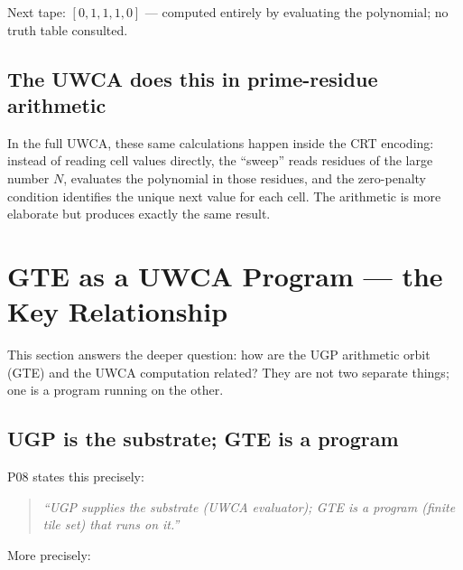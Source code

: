 \documentclass[11pt,a4paper]{article}
\begin{document}
\noindent Next tape: $[0, 1, 1, 1, 0]$ — computed entirely by evaluating the
polynomial; no truth table consulted.

\subsection{The UWCA does this in prime-residue arithmetic}

In the full UWCA, these same calculations happen inside the CRT encoding:
instead of reading cell values directly, the ``sweep'' reads residues of the
large number $N$, evaluates the polynomial in those residues, and the
zero-penalty condition identifies the unique next value for each cell.  The
arithmetic is more elaborate but produces exactly the same result.

\section{GTE as a UWCA Program — the Key Relationship}

This section answers the deeper question: how are the UGP arithmetic orbit
(GTE) and the UWCA computation related?  They are not two separate things;
one is a program running on the other.

\subsection{UGP is the substrate; GTE is a program}

P08 states this precisely:

\begin{quote}
\emph{``UGP supplies the substrate (UWCA evaluator); GTE is a program
(finite tile set) that runs on it.''}
\end{quote}

\noindent More precisely:
\end{document}
